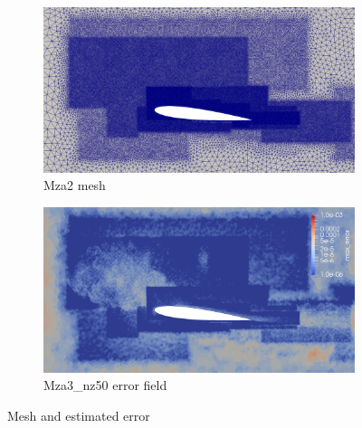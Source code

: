 \begin{figure}[H]
\begin{subfigure}[b]{0.475\textwidth}
	\centering
	\includegraphics[width=1\textwidth]{figures/zonal_adapt_results/Mesh_and_error_plots/Mza3_inplane.png}
	\caption{Mza2 mesh}
	\label{fig:zonal_Mza3_mesh}
\end{subfigure}
\begin{subfigure}[b]{0.475\textwidth}
	\centering
	\includegraphics[width=1\textwidth]{figures/zonal_adapt_results/Mesh_and_error_plots/Mza3_error.png}
	\caption{Mza3\_nz50 error field}
	\label{fig:zonal_Mza3_error}
\end{subfigure}


\caption{Mesh and estimated error}
\end{figure}